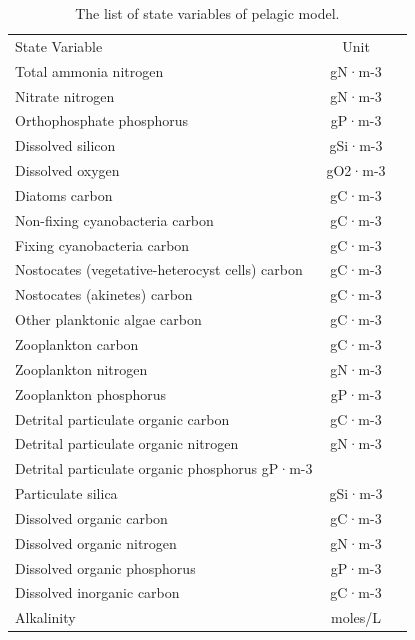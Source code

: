 \begin{table}[ht]
\caption{The list of state variables of pelagic model.}
\begin{tabular}{lcl} \hline
State Variable&	Unit \\
Total ammonia nitrogen &	gN·m-3 \\
Nitrate nitrogen	&gN·m-3\\
Orthophosphate phosphorus&	gP·m-3\\
Dissolved silicon&	gSi·m-3\\
Dissolved oxygen&	gO2·m-3\\
Diatoms carbon&	gC·m-3\\
Non-fixing cyanobacteria carbon&	gC·m-3\\
Fixing cyanobacteria carbon&	gC·m-3\\
Nostocates (vegetative-heterocyst cells) carbon	&gC·m-3\\
Nostocates (akinetes) carbon&	gC·m-3\\
Other planktonic algae carbon&	gC·m-3\\
Zooplankton carbon&	gC·m-3\\
Zooplankton nitrogen&	gN·m-3\\
Zooplankton phosphorus&	gP·m-3\\
Detrital particulate organic carbon&	gC·m-3\\
Detrital particulate organic nitrogen&	gN·m-3\\
Detrital particulate organic phosphorus	gP·m-3\\
Particulate silica&	gSi·m-3\\
Dissolved organic carbon&	gC·m-3\\
Dissolved organic nitrogen	&gN·m-3\\
Dissolved organic phosphorus&	gP·m-3\\
Dissolved inorganic carbon&	gC·m-3\\
Alkalinity	&moles/L \\
\hline
\end{tabular}
\label{tab:table_aquabc}
\end{table}

